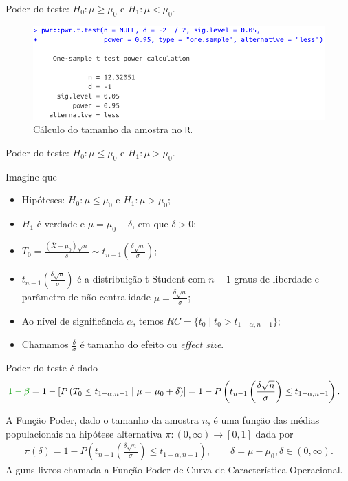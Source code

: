 \documentclass[8pt]{beamer}
\begin{document}
\begin{frame}{Poder do teste: $H_0:\mu \geq \mu_0$ e $H_1: \mu < \mu_0$.}

\begin{figure}[htbp]
	\centering
	\caption{Cálculo do tamanho da amostra no \texttt{R}.}
	\includegraphics[width=0.9\linewidth]{figures/t-noncentral-sample-size-unilateral-upper-R.png}
\end{figure}

\end{frame}


\begin{frame}{Poder do teste: $H_0:\mu \leq \mu_0$ e $H_1: \mu > \mu_0$.}

\small

Imagine que
\begin{itemize}
	\item Hipóteses: $H_0: \mu \leq \mu_0$ e $H_1: \mu > \mu_0$;
	\item $H_1$ é verdade e $\mu = \mu_0 + \delta$, em que $\delta > 0$;
	\item $T_0 = \frac{(\bar{X} - \mu_0)\sqrt{n}}{s}  \sim t_{n-1}\left( \frac{\delta \sqrt{n}}{\sigma} \right)$;
	\item $t_{n-1}\left(\frac{\delta\sqrt{n}}{\sigma}\right)$ é  a distribuição t-Student com $n-1$ graus de liberdade e parâmetro de não-centralidade $\mu = \frac{\delta \sqrt{n}}{\sigma}$;
	\item Ao nível de significância $\alpha$, temos $RC = \{ t_0 \mid t_0 > t_{1-\alpha, n-1}   \}$;
	\item Chamamos $\frac{\delta}{\sigma}$ é tamanho do efeito ou \textit{effect size}.
\end{itemize}
\vfill	

Poder do teste é dado
\begin{align*}
\textcolor{important}{1-\beta} &=1 - \left[P\left( T_0 \leq t_{1-\alpha, n-1} \mid \mu = \mu_0 + \delta \right)\right]  = 1- P\left( t_{n-1}\left( \frac{\delta\sqrt{n}}{\sigma} \right) \leq t_{1-\alpha, n-1}  \right).
\end{align*}
\vfill

A \textcolor{important}{Função Poder}, dado o tamanho da amostra $n$, é uma função das médias populacionais na hipótese alternativa  $\pi: (0, \infty) \longrightarrow [0,1]$ dada por
\begin{align*}
\pi(\delta) = 1 -  P\left( t_{n-1}\left( \frac{\delta\sqrt{n}}{\sigma} \right) \leq t_{1-\alpha, n-1} \right),\qquad \delta = \mu - \mu_0, \delta \in (0, \infty).
\end{align*}
Alguns livros chamada a Função Poder de \textcolor{important}{Curva de Característica Operacional.}

\normalsize	

\end{frame}
\end{document}
